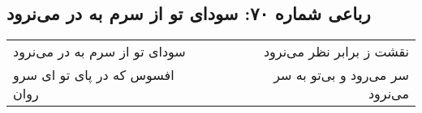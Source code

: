 \begin{center}
\section*{رباعی شماره ۷۰: سودای تو از سرم به در می‌نرود}
\label{sec:070}
\begin{longtable}{l p{0.5cm} r}
سودای تو از سرم به در می‌نرود
&&
نقشت ز برابر نظر می‌نرود
\\
افسوس که در پای تو ای سرو روان
&&
سر می‌رود و بی‌تو به سر می‌نرود
\\
\end{longtable}
\end{center}
